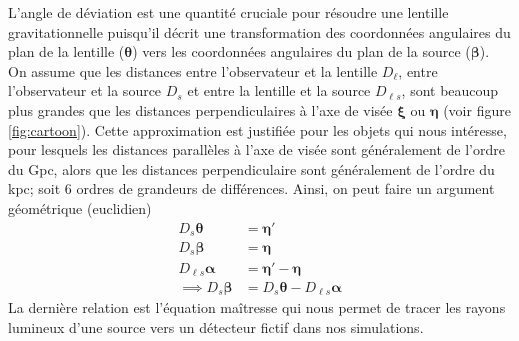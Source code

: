 L'angle de déviation est une quantité cruciale pour résoudre une lentille gravitationnelle 
puisqu'il décrit une transformation des coordonnées angulaires du plan de la lentille ($\boldsymbol{ \theta} $) 
vers les coordonnées angulaires du plan de la source ($\boldsymbol{ \beta} $). 
On assume que les distances entre l'observateur et la lentille $D_{\ell}$, entre l'observateur et la source $D_s$ et entre la lentille et la source $D_{\ell s}$, 
sont beaucoup plus grandes que les distances perpendiculaires à l'axe de visée $\boldsymbol{ \xi} $ ou $\boldsymbol{ \eta}$ 
(voir figure \ref{fig:cartoon}). 
Cette approximation est justifiée pour les objets qui nous intéresse,
pour lesquels les distances parallèles à l'axe de visée sont généralement 
de l'ordre du Gpc, alors que les distances perpendiculaire sont généralement 
de l'ordre du kpc; soit 6 ordres de grandeurs de différences.
Ainsi, on peut faire un argument géométrique (euclidien) 
\begin{align}
\nonumber
       D_{s} \boldsymbol{ \theta} &= \boldsymbol{ \eta}' \\   
\nonumber
       D_{s} \boldsymbol{ \beta} &= \boldsymbol{ \eta} \\   
\nonumber
       D_{\ell s} \boldsymbol{ \alpha} &= \boldsymbol{ \eta}' - \boldsymbol{ \eta}  \\   
\label{eq:lens equation}
       \implies D_s \boldsymbol{ \beta} &= D_s \boldsymbol{ \theta} - D_{\ell s} \boldsymbol{ \alpha}   
\end{align} 
La dernière relation est l'équation maîtresse qui nous permet de tracer les rayons lumineux d'une source 
vers un détecteur fictif dans nos simulations. 

